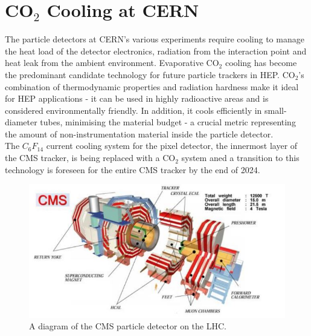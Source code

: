 \documentclass{report}
\begin{document}
\section{CO\texorpdfstring{$_2$}{TEXT} Cooling at CERN}
The particle detectors at CERN's various experiments require cooling to manage the heat load of the detector electronics, radiation from the interaction point and heat leak from the ambient environment. Evaporative CO$_2$ cooling has become the predominant candidate technology for future particle trackers in HEP. CO$_2$'s combination of thermodynamic properties and radiation hardness make it ideal for HEP applications - it can be used in highly radioactive areas and is considered environmentally friendly. In addition, it cools efficiently in small-diameter tubes, minimising the material budget - a crucial metric representing the amount of non-instrumentation material inside the particle detector. \\The $C_6F_14$ current cooling system for the pixel detector, the innermost layer of the CMS tracker, is  being replaced with a CO$_2$ system aned a transition to this technology is foreseen for the entire CMS tracker by the end of 2024.

\begin{figure}[h!]
\includegraphics[width=\textwidth]{figures/CMS.jpg}
\caption{A diagram of the CMS particle detector on the LHC. \cite{mishra}}
\label{fig: cms}
\end{figure}	
\end{document}
